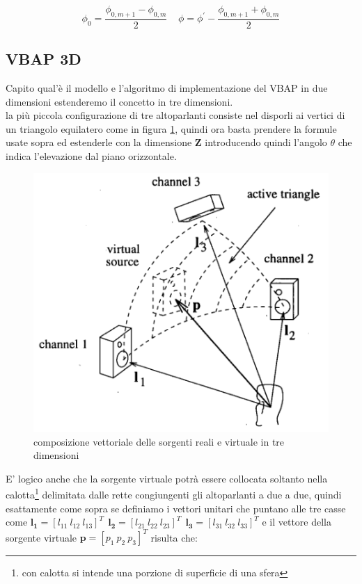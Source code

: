 \documentclass[12pt,a4paper]{report}
\begin{document}
\begin{equation}
\phi_0 = \dfrac{\phi_{0,m+1}-\phi_{0,m}}{2} \ \ \ \ \ \phi=\phi^{\prime}-\dfrac{\phi_{0,m+1}+\phi_{0,m}}{2}
\label{phidiverso}
\end{equation}


\subsection{VBAP 3D}

Capito qual'è il modello e l'algoritmo di implementazione del VBAP in due dimensioni estenderemo il concetto in tre dimensioni.\\

la più piccola configurazione di tre altoparlanti consiste nel disporli ai vertici di un triangolo equilatero come in figura \ref{fig:triangolo}, quindi ora basta prendere la formule usate sopra ed estenderle con la dimensione $\boldsymbol{Z}$ introducendo quindi l'angolo $\theta$ che indica l'elevazione dal piano orizzontale.

\begin{figure}[htbp]
	\centering
	\includegraphics[scale=0.40]{figures/matrix3d.png}
	\caption {composizione vettoriale delle sorgenti reali e virtuale in tre dimensioni} 
	\label{fig:triangolo}
	\end{figure}

E' logico anche che la sorgente virtuale potrà essere collocata soltanto nella calotta\footnote{con calotta si intende una porzione di superficie di una sfera} delimitata dalle rette congiungenti gli altoparlanti a due a due,	 quindi esattamente come sopra se definiamo i vettori unitari che puntano alle tre casse come $ \boldsymbol{l_{1}}= {\left[ l_{11} \ l_{12} \ l_{13} \right]}^T \ \ \boldsymbol{l_{2}}= {\left[ l_{21} \ l_{22} \ l_{23} \right]}^T \ \ \boldsymbol{l_{3}}= {\left[ l_{31} \ l_{32} \ l_{33} \right]}^T$ e il vettore della sorgente virtuale $\boldsymbol{p}= {\left[ p_{1} \ p_{2} \ p_{3} \right]}^T$ risulta che:
\end{document}
